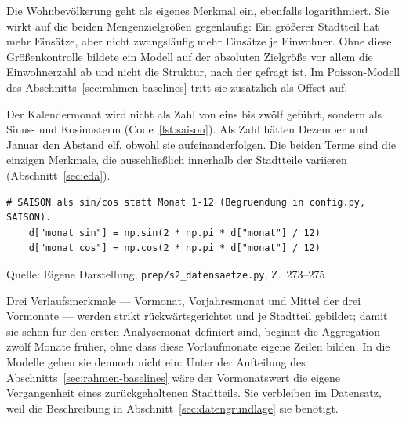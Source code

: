 \documentclass[12pt,a4paper]{article}
\newcommand{\tabquelle}[1][Eigene Darstellung]{%
  \par\setlength{\parskip}{0pt}\vspace{3pt}%
  {\setstretch{1}\fontsize{9pt}{11pt}\selectfont\raggedright Quelle: #1\par}%
}
\begin{document}
Die Wohnbevölkerung geht als eigenes Merkmal ein, ebenfalls logarithmiert. Sie
wirkt auf die beiden Mengenzielgrößen gegenläufig: Ein größerer Stadtteil hat
mehr Einsätze, aber nicht zwangsläufig mehr Einsätze je Einwohner. Ohne diese
Größenkontrolle bildete ein Modell auf der absoluten Zielgröße vor allem die
Einwohnerzahl ab und nicht die Struktur, nach der gefragt ist. Im
Poisson-Modell des Abschnitts~\ref{sec:rahmen-baselines} tritt sie zusätzlich
als Offset auf.
 
Der Kalendermonat wird nicht als Zahl von eins bis zwölf geführt, sondern als
Sinus- und Kosinusterm (Code~\ref{lst:saison}). Als Zahl hätten Dezember und Januar den Abstand elf,
obwohl sie aufeinanderfolgen. Die beiden Terme sind die einzigen Merkmale, die
ausschließlich innerhalb der Stadtteile variieren (Abschnitt~\ref{sec:eda}).

\begin{quellcode}[htbp]
\caption{Der Kalendermonat als Sinus und Kosinus}
\label{lst:saison}\vspace{-3.5pt}
\begin{lstlisting}[style=pythonstil,firstnumber=273]
    # SAISON als sin/cos statt Monat 1-12 (Begruendung in config.py, SAISON).
    d["monat_sin"] = np.sin(2 * np.pi * d["monat"] / 12)
    d["monat_cos"] = np.cos(2 * np.pi * d["monat"] / 12)
\end{lstlisting}
\tabquelle[Eigene Darstellung, \texttt{prep/s2\_datensaetze.py}, Z.~273--275]
\end{quellcode}
 
Drei Verlaufsmerkmale --- Vormonat, Vorjahresmonat und Mittel der drei
Vormonate --- werden strikt rückwärtsgerichtet und je Stadtteil gebildet; damit
sie schon für den ersten Analysemonat definiert sind, beginnt die Aggregation
zwölf Monate früher, ohne dass diese Vorlaufmonate eigene Zeilen bilden. In die
Modelle gehen sie dennoch nicht ein: Unter der Aufteilung des
Abschnitts~\ref{sec:rahmen-baselines} wäre der Vormonatswert die eigene
Vergangenheit eines zurückgehaltenen Stadtteils. Sie verbleiben im Datensatz,
weil die Beschreibung in Abschnitt~\ref{sec:datengrundlage} sie benötigt.
 
\end{document}
